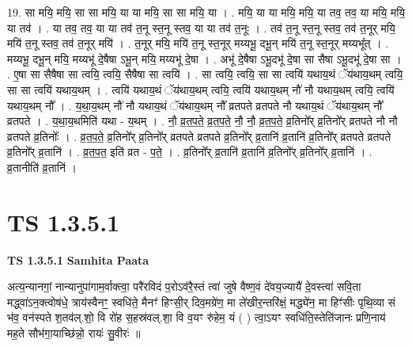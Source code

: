 \documentclass[17pt]{extarticle}
\begin{document}
19. सा मयि॒ मयि॒ सा सा मयि॒ या या मयि॒ सा सा मयि॒ या । . मयि॒ या या मयि॒ मयि॒ या तव॒ तव॒ या मयि॒ मयि॒ या तव॑ । . या तव॒ तव॒ या या तव॑ त॒नू स्त॒नू स्तव॒ या या तव॑ त॒नूः । . तव॑ त॒नू स्त॒नू स्तव॒ तव॑ त॒नूर् मयि॒ मयि॑ त॒नू स्तव॒ तव॑ त॒नूर् मयि॑ । . त॒नूर् मयि॒ मयि॑ त॒नू स्त॒नूर् मय्यभू॒ दभू॒न् मयि॑ त॒नू स्त॒नूर् मय्यभू᳚त् । . मय्यभू॒ दभू॒न् मयि॒ मय्यभू॑ दे॒षैषा ऽभू॒न् मयि॒ मय्यभू॑ दे॒षा । . अभू॑ दे॒षैषा ऽभू॒दभू॑ दे॒षा सा सैषा ऽभू॒दभू॑ दे॒षा सा । . ए॒षा सा सैषैषा सा त्वयि॒ त्वयि॒ सैषैषा सा त्वयि॑ । . सा त्वयि॒ त्वयि॒ सा सा त्वयि॑ यथाय॒थं ॅय॑थाय॒थम् त्वयि॒ सा सा त्वयि॑ यथाय॒थम् । . त्वयि॑ यथाय॒थं ॅय॑थाय॒थम् त्वयि॒ त्वयि॑ यथाय॒थम् नौ॑ नौ यथाय॒थम् त्वयि॒ त्वयि॑ यथाय॒थम् नौ᳚ । . य॒था॒य॒थम् नौ॑ नौ यथाय॒थं ॅय॑थाय॒थम् नौ᳚ व्रतपते व्रतपते नौ यथाय॒थं ॅय॑थाय॒थम् नौ᳚ व्रतपते । . य॒था॒य॒थमिति॑ यथा - य॒थम् । . नौ॒ व्र॒त॒प॒ते॒ व्र॒त॒प॒ते॒ नौ॒ नौ॒ व्र॒त॒प॒ते॒ व्र॒तिनो᳚र् व्र॒तिनो᳚र् व्रतपते नौ नौ व्रतपते व्र॒तिनोः᳚ । . व्र॒त॒प॒ते॒ व्र॒तिनो᳚र् व्र॒तिनो᳚र् व्रतपते व्रतपते व्र॒तिनो᳚र् व्र॒तानि॑ व्र॒तानि॑ व्र॒तिनो᳚र् व्रतपते व्रतपते व्र॒तिनो᳚र् व्र॒तानि॑ । . व्र॒त॒प॒त॒ इति॑ व्रत - प॒ते॒ । . व्र॒तिनो᳚र् व्र॒तानि॑ व्र॒तानि॑ व्र॒तिनो᳚र् व्र॒तिनो᳚र् व्र॒तानि॑ । . व्र॒तानीति॑ व्र॒तानि॑ । \newline
\pagebreak
{}

\section{ TS 1.3.5.1 }

\textbf{TS 1.3.5.1 } \newline
\textbf{Samhita Paata} \newline

अत्य॒न्यानगां॒ नान्यानुपा॑गाम॒र्वाक्त्वा॒ परै॑रविदं प॒रोऽव॑रै॒स्तं त्वा॑ जुषे वैष्ण॒वं दे॑वय॒ज्यायै॑ दे॒वस्त्वा॑ सवि॒ता मद्ध्वा॑ऽन॒क्त्वोष॑धे॒ त्राय॑स्वैनꣳ॒॒ स्वधि॑ते॒ मैनꣳ॑ हिꣳसी॒र् दिव॒मग्रे॑ण॒ मा ले॑खीर॒न्तरि॑क्षं॒ मद्ध्ये॑न॒ मा हिꣳ॑सीः पृथि॒व्या सं भ॑व॒ वन॑स्पते श॒तव॑ल्.शो॒ वि रो॑ह स॒हस्र॑वल्.शा॒ वि व॒यꣳ रु॑हेम॒ यं ( ) त्वा॒ऽयꣳ स्वधि॑ति॒स्तेति॑जानः प्रणि॒नाय॑ मह॒ते सौभ॑गा॒याच्छि॑न्नो॒ रायः॑ सु॒वीरः॑ ॥ \newline
\end{document}
